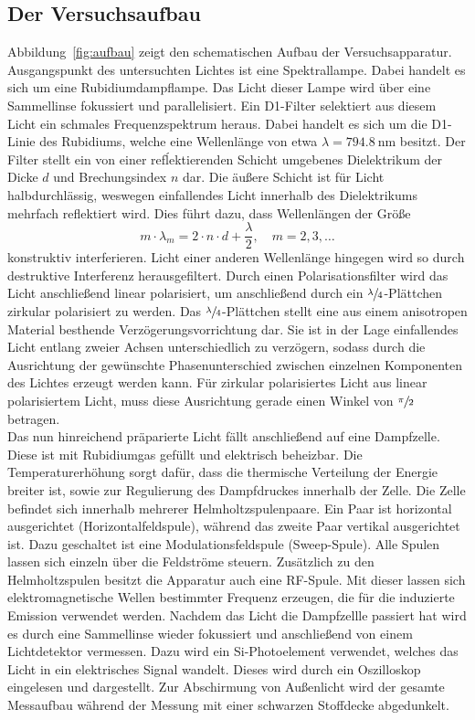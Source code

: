 \documentclass[
  bibliography=totoc,     %
  captions=tableheading,  %
  titlepage=firstiscover, %
]{scrartcl}
\begin{document}
\subsection{Der Versuchsaufbau}
Abbildung~\ref{fig:aufbau} zeigt den schematischen Aufbau der Versuchsapparatur.
Ausgangspunkt des untersuchten Lichtes ist eine Spektrallampe. Dabei handelt es
sich um eine Rubidiumdampflampe. Das Licht dieser Lampe wird über eine
Sammellinse fokussiert und parallelisiert. Ein D1-Filter selektiert aus diesem
Licht ein schmales Frequenzspektrum heraus. Dabei handelt es sich um die
D1-Linie des Rubidiums, welche eine Wellenlänge von etwa
$\lambda=\SI{794.8}{\nano\metre}$ besitzt. Der Filter stellt ein von einer
refĺektierenden Schicht umgebenes Dielektrikum der Dicke $d$ und
Brechungsindex $n$ dar. Die äußere Schicht ist für Licht halbdurchlässig,
weswegen einfallendes Licht innerhalb des Dielektrikums mehrfach reflektiert
wird. Dies führt dazu, dass Wellenlängen der Größe
%
\begin{equation}
  m\cdot\lambda_m=2\cdot n\cdot d+\frac{\lambda}{2}, \quad m=2,3,\ldots
\end{equation}
%
konstruktiv interferieren. Licht einer anderen Wellenlänge hingegen wird so
durch destruktive Interferenz herausgefiltert. Durch einen Polarisationsfilter
wird das Licht anschließend linear polarisiert, um anschließend durch ein
$\sfrac{\lambda}{4}$-Plättchen zirkular polarisiert zu werden. Das
$\sfrac{\lambda}{4}$-Plättchen stellt eine aus einem anisotropen Material
besthende Verzögerungsvorrichtung dar. Sie ist in der Lage einfallendes Licht
entlang zweier Achsen unterschiedlich zu verzögern, sodass durch die Ausrichtung
der gewünschte Phasenunterschied zwischen einzelnen Komponenten des Lichtes
erzeugt werden kann. Für zirkular polarisiertes Licht aus linear polarisiertem Licht,
muss diese Ausrichtung gerade einen Winkel von $\sfrac{\pi}{2}$ betragen. \\
Das nun hinreichend präparierte Licht fällt anschließend auf eine Dampfzelle.
Diese ist mit Rubidiumgas gefüllt und elektrisch beheizbar. Die Temperaturerhöhung
sorgt dafür, dass die thermische Verteilung der Energie breiter ist, sowie zur
Regulierung des Dampfdruckes innerhalb der Zelle. Die Zelle befindet sich
innerhalb mehrerer Helmholtzspulenpaare. Ein Paar ist horizontal ausgerichtet
(Horizontalfeldspule), während das zweite Paar vertikal ausgerichtet ist. Dazu
geschaltet ist eine Modulationsfeldspule (Sweep-Spule). Alle Spulen lassen sich
einzeln über die Feldströme steuern. Zusätzlich zu den Helmholtzspulen besitzt
die Apparatur auch eine RF-Spule. Mit dieser lassen sich elektromagnetische Wellen
bestimmter Frequenz erzeugen, die für die induzierte Emission verwendet werden.
Nachdem das Licht die Dampfzellle passiert hat wird es durch eine Sammellinse
wieder fokussiert und anschließend von einem Lichtdetektor vermessen.
Dazu wird ein Si-Photoelement verwendet, welches das Licht in ein elektrisches
Signal wandelt. Dieses wird durch ein Oszilloskop eingelesen und dargestellt.
Zur Abschirmung von Außenlicht wird der gesamte Messaufbau während der Messung
mit einer schwarzen Stoffdecke abgedunkelt.
\end{document}
